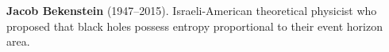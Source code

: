 \textbf{Jacob Bekenstein} (1947–2015). Israeli-American theoretical physicist who proposed that black holes possess entropy proportional to their event horizon area.

